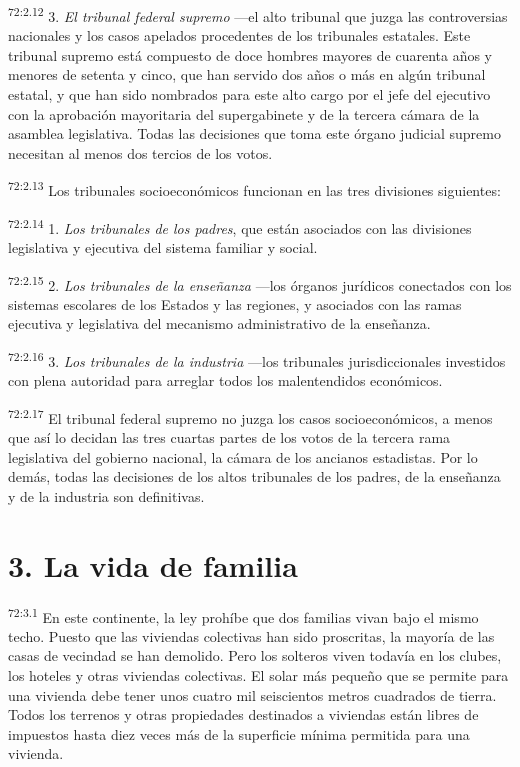 \documentclass[twoside, 11pt]{book}
\begin{document}
\par
\textsuperscript{72:2.12} 3. \textit{El tribunal federal supremo} ---el alto tribunal que juzga las controversias nacionales y los casos apelados procedentes de los tribunales estatales. Este tribunal supremo está compuesto de doce hombres mayores de cuarenta años y menores de setenta y cinco, que han servido dos años o más en algún tribunal estatal, y que han sido nombrados para este alto cargo por el jefe del ejecutivo con la aprobación mayoritaria del supergabinete y de la tercera cámara de la asamblea legislativa. Todas las decisiones que toma este órgano judicial supremo necesitan al menos dos tercios de los votos.

\par
\textsuperscript{72:2.13} Los tribunales socioeconómicos funcionan en las tres divisiones siguientes:

\par
\textsuperscript{72:2.14} 1. \textit{Los tribunales de los padres}, que están asociados con las divisiones legislativa y ejecutiva del sistema familiar y social.

\par
\textsuperscript{72:2.15} 2. \textit{Los tribunales de la enseñanza} ---los órganos jurídicos conectados con los sistemas escolares de los Estados y las regiones, y asociados con las ramas ejecutiva y legislativa del mecanismo administrativo de la enseñanza.

\par
\textsuperscript{72:2.16} 3. \textit{Los tribunales de la industria} ---los tribunales jurisdiccionales investidos con plena autoridad para arreglar todos los malentendidos económicos.

\par
\textsuperscript{72:2.17} El tribunal federal supremo no juzga los casos socioeconómicos, a menos que así lo decidan las tres cuartas partes de los votos de la tercera rama legislativa del gobierno nacional, la cámara de los ancianos estadistas. Por lo demás, todas las decisiones de los altos tribunales de los padres, de la enseñanza y de la industria son definitivas.

\section*{3. La vida de familia}
\par
\textsuperscript{72:3.1} En este continente, la ley prohíbe que dos familias vivan bajo el mismo techo. Puesto que las viviendas colectivas han sido proscritas, la mayoría de las casas de vecindad se han demolido. Pero los solteros viven todavía en los clubes, los hoteles y otras viviendas colectivas. El solar más pequeño que se permite para una vivienda debe tener unos cuatro mil seiscientos metros cuadrados de tierra. Todos los terrenos y otras propiedades destinados a viviendas están libres de impuestos hasta diez veces más de la superficie mínima permitida para una vivienda.
\end{document}
